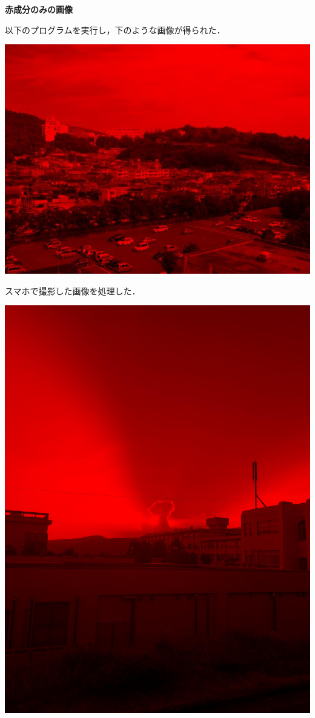 \documentclass[11pt]{jarticle}
\begin{document}
{\bf 赤成分のみの画像}

以下のプログラムを実行し，下のような画像が得られた．

\includegraphics[scale=.5]{./img/red.jpg}

スマホで撮影した画像を処理した．

\includegraphics[scale=.1]{./img/tsuyama_red.jpg}
\end{document}
